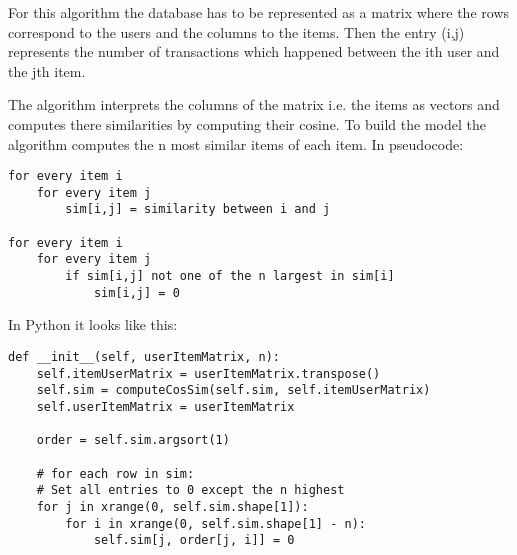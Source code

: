 For this algorithm the database has to be represented as a matrix
where the rows correspond to the users and the columns to the items.
Then the entry (i,j) represents the number of transactions which happened
between the ith user and the jth item. 

The algorithm interprets the columns of the matrix i.e. the items
as vectors and computes there similarities by computing their cosine.
To build the model the algorithm computes the n most similar items
of each item. In pseudocode:
\begin{lstlisting}
for every item i
    for every item j
        sim[i,j] = similarity between i and j

for every item i
    for every item j
        if sim[i,j] not one of the n largest in sim[i]
            sim[i,j] = 0
\end{lstlisting}
In Python it looks like this:
\begin{lstlisting}
def __init__(self, userItemMatrix, n):
    self.itemUserMatrix = userItemMatrix.transpose()
    self.sim = computeCosSim(self.sim, self.itemUserMatrix)
    self.userItemMatrix = userItemMatrix

    order = self.sim.argsort(1)

    # for each row in sim:
    # Set all entries to 0 except the n highest
    for j in xrange(0, self.sim.shape[1]):
        for i in xrange(0, self.sim.shape[1] - n):
            self.sim[j, order[j, i]] = 0
\end{lstlisting}


